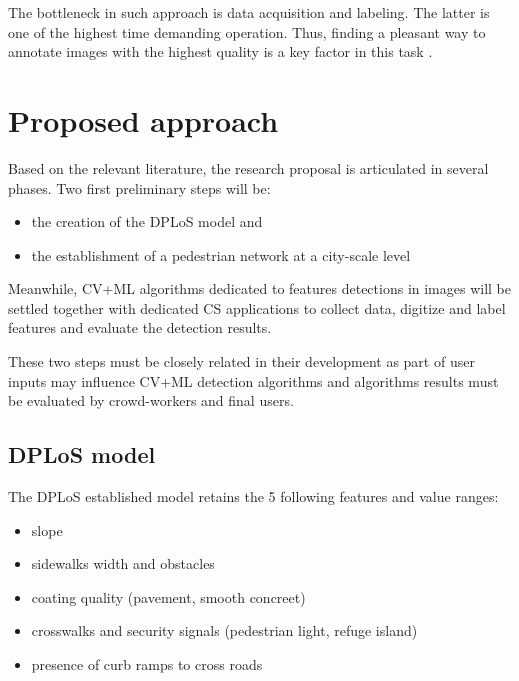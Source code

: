 \documentclass[10pt,conference,a4paper]{IEEEtran}
\begin{document}
The bottleneck in such approach is data acquisition and labeling. The latter is one of the highest time demanding operation. Thus, finding a pleasant way to annotate images with the highest quality is a key factor in this task \cite{von2006peekaboom}.






\section{Proposed approach}
Based on the relevant literature, the research proposal is articulated in several phases.
Two first preliminary steps will be:
\begin{itemize}\setlength\itemsep{0.0em}
\item the creation of the DPLoS model and
\item the establishment of a pedestrian network at a city-scale level %
\end{itemize}  

Meanwhile, CV+ML algorithms dedicated to features detections in images will be settled together with dedicated CS applications to collect data, digitize and label features and evaluate the detection results.

These two steps must be closely related in their development as part of user inputs may influence CV+ML detection algorithms and algorithms results must be evaluated by crowd-workers and final users. 

\subsection{DPLoS model}
The DPLoS established model retains the 5 following features and value ranges: %
\begin{itemize}
\item slope
\item sidewalks width and obstacles
\item coating quality (pavement, smooth concreet)
\item crosswalks and security signals (pedestrian light, refuge island)
\item presence of curb ramps to cross roads
\end{itemize}
\end{document}
